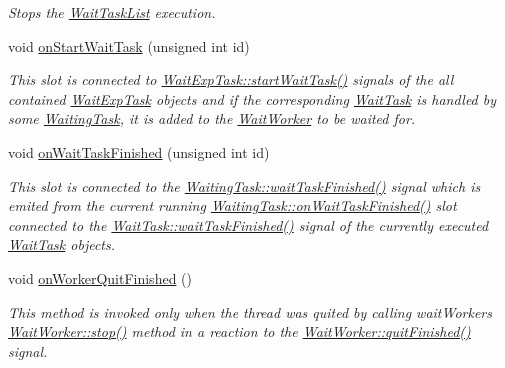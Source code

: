 \begin{DoxyCompactItemize}
\begin{DoxyCompactList}\small\item\em Stops the \hyperlink{class_wait_task_list}{Wait\+Task\+List} execution. \end{DoxyCompactList}\item 
void \hyperlink{class_wait_task_list_a802528b32bbcacb201bdd5fcfc4dacf6}{on\+Start\+Wait\+Task} (unsigned int id)
\begin{DoxyCompactList}\small\item\em This slot is connected to \hyperlink{class_wait_exp_task_a0e6b8df7760857ace81f82deb888fb23}{Wait\+Exp\+Task\+::start\+Wait\+Task()} signals of the all contained \hyperlink{class_wait_exp_task}{Wait\+Exp\+Task} objects and if the corresponding \hyperlink{class_wait_task}{Wait\+Task} is handled by some \hyperlink{class_waiting_task}{Waiting\+Task}, it is added to the \hyperlink{class_wait_worker}{Wait\+Worker} to be waited for. \end{DoxyCompactList}\item 
void \hyperlink{class_wait_task_list_ab6c3634d0739c8948b028c8db86d804c}{on\+Wait\+Task\+Finished} (unsigned int id)
\begin{DoxyCompactList}\small\item\em This slot is connected to the \hyperlink{class_waiting_task_a603610acef7edaa2e0e51af6776a18ca}{Waiting\+Task\+::wait\+Task\+Finished()} signal which is emited from the current running \hyperlink{class_waiting_task_a93e5b1b87723904e6a4babef1bbd4727}{Waiting\+Task\+::on\+Wait\+Task\+Finished()} slot connected to the \hyperlink{class_wait_task_ae52cf854c36339a1cad9c643e6259978}{Wait\+Task\+::wait\+Task\+Finished()} signal of the currently executed \hyperlink{class_wait_task}{Wait\+Task} objects. \end{DoxyCompactList}\item 
void \hyperlink{class_wait_task_list_acb4be74c64bd3df403657f625384f453}{on\+Worker\+Quit\+Finished} ()
\begin{DoxyCompactList}\small\item\em This method is invoked only when the thread was quited by calling wait\+Worker\textquotesingle{}s \hyperlink{class_wait_worker_af01864effa7662c8261128ff12fb922d}{Wait\+Worker\+::stop()} method in a reaction to the \hyperlink{class_wait_worker_a5f65bc5e4691e9542afef8df55bf27be}{Wait\+Worker\+::quit\+Finished()} signal. \end{DoxyCompactList}\end{DoxyCompactItemize}
